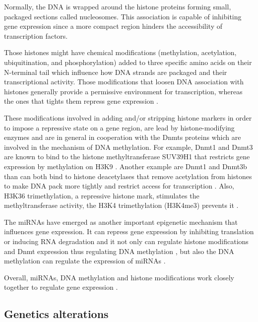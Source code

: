Normally, the DNA is wrapped around the histone proteins forming small, packaged sections called nucleosomes.
This association is capable of inhibiting gene expression since a more compact region
hinders the accessibility of transcription factors.

Those histones might have chemical modifications (methylation, acetylation, ubiquitination, and phosphorylation) added to three specific amino acids on their N-terminal tail which influence how DNA strands are packaged and their transcriptional activity.
Those modifications that loosen DNA association with histones generally provide a permissive environment for transcription, whereas the ones that tights them repress gene expression \cite{moore2013dna}.

These modifications involved in adding and/or stripping histone markers in order to impose a repressive state on a gene region, are lead by histone-modifying enzymes and are in general in cooperation with the Dnmts proteins
which are involved in the mechanism of DNA methylation.
For example, Dnmt1 and Dnmt3 are known to bind to the histone methyltransferase SUV39H1 that
restricts gene expression by methylation on H3K9 \cite{fuks2003dna}.
Another example are Dnmt1 and Dnmt3b than can both bind to histone deacetylases that remove
acetylation from histones to make DNA pack more tightly and restrict access for transcription \cite{fuks2000dna,geiman2004dnmt3b}.
Also, H3K36 trimethylation, a repressive histone mark, stimulates the methyltransferase activity, the
H3K4 trimethylation (H3K4me3) prevents it \cite{ooi2007dnmt3l,zhang2010chromatin}.

The miRNAs have emerged as another important epigenetic mechanism that influences gene expression.
It can repress gene expression by inhibiting translation or inducing RNA degradation \cite{berezikov2011evolution} and
 it not only can regulate histone modifications and Dnmt expression thus regulating DNA methylation \cite{benetti2008mammalian,sinkkonen2008micrornas}, but also the DNA methylation can regulate the expression of miRNAs \cite{han2007dna,lujambio2008microrna}.

Overall, miRNAs, DNA methylation and histone modifications work closely
together to regulate gene expression \cite{moore2013dna}.

\subsection{Genetics alterations}

